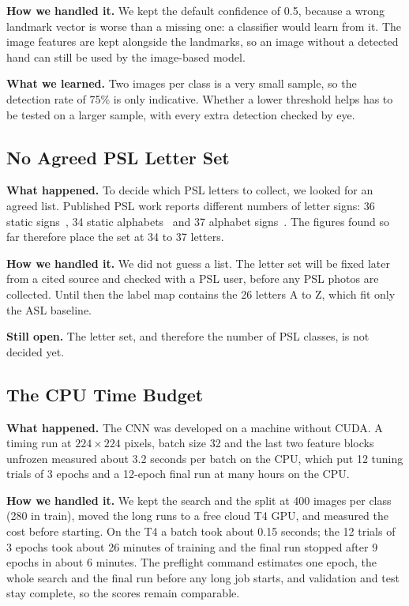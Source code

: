 \textbf{How we handled it.} We kept the default confidence of 0.5, because a wrong landmark vector is worse than a missing one: a classifier would learn from it. The image features are kept alongside the landmarks, so an image without a detected hand can still be used by the image-based model.

\textbf{What we learned.} Two images per class is a very small sample, so the detection rate of 75\% is only indicative. Whether a lower threshold helps has to be tested on a larger sample, with every extra detection checked by eye.

\subsection{No Agreed PSL Letter Set}
\label{sec:challenge-letter-set}

\textbf{What happened.} To decide which PSL letters to collect, we looked for an agreed list. Published PSL work reports different numbers of letter signs: 36 static signs~\cite{sajid2025ualpha40}, 34 static alphabets~\cite{colorglove_psl} and 37 alphabet signs~\cite{butt_psl_kaggle}. The figures found so far therefore place the set at 34 to 37 letters.

\textbf{How we handled it.} We did not guess a list. The letter set will be fixed later from a cited source and checked with a PSL user, before any PSL photos are collected. Until then the label map contains the 26 letters A to Z, which fit only the ASL baseline.

\textbf{Still open.} The letter set, and therefore the number of PSL classes, is not decided yet.

\subsection{The CPU Time Budget}
\label{sec:challenge-cpu}

\textbf{What happened.} The CNN was developed on a machine without CUDA. A timing run at $224\times224$ pixels, batch size 32 and the last two feature blocks unfrozen measured about 3.2 seconds per batch on the CPU, which put 12 tuning trials of 3 epochs and a 12-epoch final run at many hours on the CPU.

\textbf{How we handled it.} We kept the search and the split at 400 images per class (280 in train), moved the long runs to a free cloud T4 GPU, and measured the cost before starting. On the T4 a batch took about 0.15 seconds; the 12 trials of 3 epochs took about 26 minutes of training and the final run stopped after 9 epochs in about 6 minutes. The preflight command estimates one epoch, the whole search and the final run before any long job starts, and validation and test stay complete, so the scores remain comparable.

